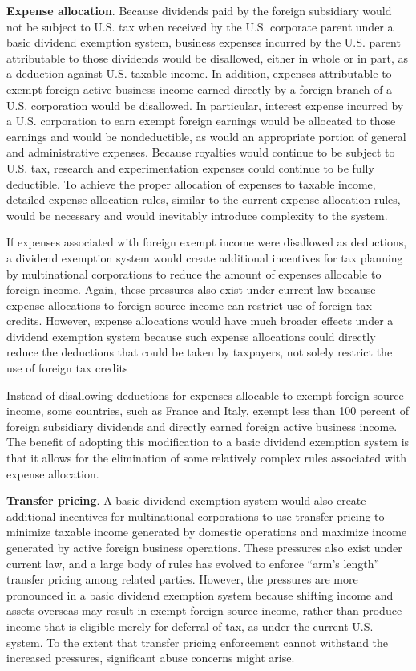 \begin{select}
\textbf{Expense allocation}.  Because dividends paid by the foreign subsidiary would not be 
subject to U.S. tax when received by the U.S. corporate parent under a basic dividend 
exemption system, business expenses incurred by the U.S. parent attributable to those 
dividends would be disallowed, either in whole or in part, as a deduction against U.S. 
taxable income.  In addition, expenses attributable to exempt foreign active business 
income earned directly by a foreign branch of a U.S. corporation would be disallowed.  In 
particular, interest expense incurred by a U.S. corporation to earn exempt foreign 
earnings would be allocated to those earnings and would be nondeductible, as would an 
appropriate portion of general and administrative expenses.  Because royalties would 
continue to be subject to U.S. tax, research and experimentation expenses could continue 
to be fully deductible.  To achieve the proper allocation of expenses to taxable income, 
detailed expense allocation rules, similar to the current expense allocation rules, would be 
necessary and would inevitably introduce complexity to the system. 
  
If expenses associated with foreign exempt income were disallowed as 
deductions, a dividend exemption system would create additional incentives for tax 
planning by multinational corporations to reduce the amount of expenses allocable to 
foreign income.  Again, these pressures also exist under current law because expense 
allocations to foreign source income can restrict use of foreign tax credits.  However, 
expense allocations would have much broader effects under a dividend exemption system 
because such expense allocations could directly reduce the deductions that could be taken 
by taxpayers, not solely restrict the use of foreign tax credits 
 
Instead of disallowing deductions for expenses allocable to exempt foreign source 
income, some countries, such as France and Italy, exempt less than 100 percent of foreign 
subsidiary dividends and directly earned foreign active business income.  The benefit of 
adopting this modification to a basic dividend exemption system is that it allows for the 
elimination of some relatively complex rules associated with expense allocation. 
   
\textbf{Transfer pricing}.  A basic dividend exemption system would also create additional 
incentives for multinational corporations to use transfer pricing to minimize taxable 
income generated by domestic operations and maximize income generated by active 
foreign business operations.  These pressures also exist under current law, and a large 
body of rules has evolved to enforce ``arm's length'' transfer pricing among related 
parties.  However, the pressures are more pronounced in a basic dividend exemption 
system because shifting income and assets overseas may result in exempt foreign source 
income, rather than produce income that is eligible merely for deferral of tax, as under 
the current U.S. system.  To the extent that transfer pricing enforcement cannot withstand 
the increased pressures, significant abuse concerns might arise.   
 

\end{select}
